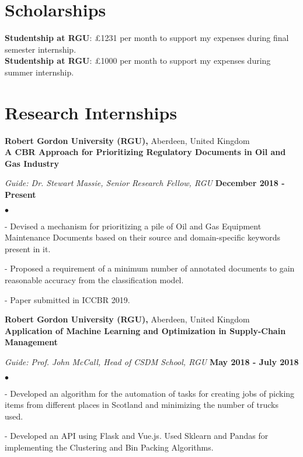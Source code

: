 \documentclass[margin,line]{res}
\newenvironment{list2}{
  \begin{list}{$\bullet$}{%
      \setlength{\itemsep}{0in}
      \setlength{\parsep}{0in} \setlength{\parskip}{0in}
      \setlength{\topsep}{0in} \setlength{\partopsep}{0in} 
      \setlength{\leftmargin}{0.2in}}}{\end{list}}
\begin{document}
\begin{resume}
\vspace{-0.1in}
\section{\sc Scholarships}
{\bf Studentship at RGU}: \pounds 1231 per month to support my expenses during final semester internship.\\
{\bf Studentship at RGU}: \pounds 1000 per month to support my expenses during summer internship.

\vspace{-0.1in}
\section{\sc Research Internships}
{\bf Robert Gordon University (RGU),} Aberdeen, United Kingdom\\
{\bf A CBR Approach for Prioritizing Regulatory Documents in Oil and Gas Industry}

\vspace{-.3cm}
{\em Guide: Dr. Stewart Massie, Senior Research Fellow, RGU} \hfill {\bf December 2018 - Present}\\
\vspace*{-.4cm}
\begin{list2}
\item[-] Devised a mechanism for prioritizing a pile of Oil and Gas Equipment Maintenance Documents based on their source and domain-specific keywords present in it.
\item[-] Proposed a requirement of a minimum number of annotated documents to gain reasonable accuracy from the classification model.
\item[-] Paper submitted in ICCBR 2019.
\end{list2}

\vspace{-0.1in}

{\bf Robert Gordon University (RGU),} Aberdeen, United Kingdom\\
{\bf Application of Machine Learning and Optimization in Supply-Chain Management}

\vspace{-.3cm}
{\em Guide: Prof. John McCall, Head of CSDM School, RGU} \hfill {\bf May 2018 - July 2018}\\
\vspace*{-.4cm}
\begin{list2}
\item[-] Developed an algorithm for the automation of tasks for creating jobs of picking items from different places in Scotland and minimizing the number of trucks used.
\item[-] Developed an API using Flask and Vue.js. Used Sklearn and Pandas for implementing the Clustering and Bin Packing Algorithms.
\end{list2}


\end{resume}
\end{document}
